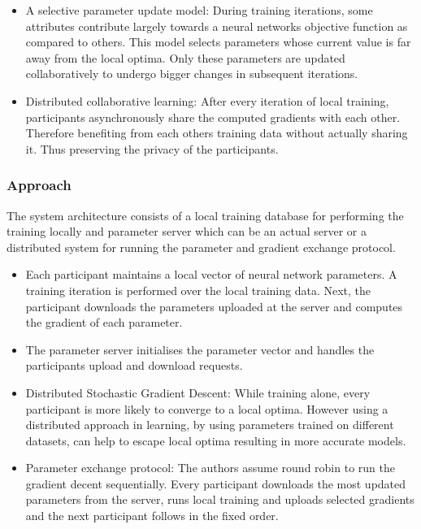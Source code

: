 \begin{itemize}
	\item A selective parameter update model: During training iterations, some attributes contribute largely
	towards a neural networks objective function as compared to others. This model selects parameters whose
	current value is far away from the local optima. Only these parameters are updated collaboratively to 
	undergo bigger changes in subsequent iterations. 
	
	\item Distributed collaborative learning: After every iteration of local training, participants
	asynchronously share the computed gradients with each other. Therefore benefiting from each others
	training data without actually sharing it. Thus preserving the privacy of the participants.  
	
\end{itemize}

\subsubsection*{Approach}

The system architecture consists of a local training database for performing the training locally
and parameter server which can be an actual server or a distributed system for running the parameter 
and gradient exchange protocol. 

\begin{itemize}
	\item Each participant maintains a local vector of neural network parameters. A training iteration
	is performed over the local training data. Next, the participant downloads the parameters uploaded 
	at the server and computes the gradient of each parameter. 
	
	\item The parameter server initialises the parameter vector and handles the participants upload and 
	download requests. 
	
	\item Distributed Stochastic Gradient Descent: While training alone, every participant is more likely 
	to converge to a local optima. However using a distributed approach in learning, by using parameters
	trained on different datasets, can help to escape local optima resulting in more accurate models. 
	
	\item Parameter exchange protocol: The authors assume round robin to run the gradient decent 
	sequentially. Every participant downloads the most updated parameters from the server, runs local 
	training and uploads selected gradients and the next participant follows in the fixed order. 
\end{itemize}

